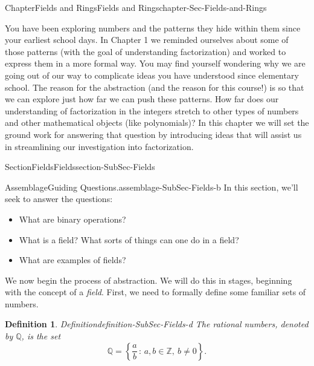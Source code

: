 \documentclass[oneside,10pt,]{book}
\numberwithin{equation}{section}
\newcommand{\setof}[2]{{\left\{#1\,\colon\,#2\right\}}}
\def\Z{{\mathbb Z}}
\def\Q{{\mathbb Q}}
\newtheorem{definition}[theorem]{Definition}
\begin{document}
\typeout{************************************************}
%
\begin{chapterptx}{Chapter}{Fields and Rings}{}{Fields and Rings}{}{}{chapter-Sec-Fields-and-Rings}
\renewcommand*{\chaptername}{Chapter}
\begin{introduction}{}%
You have been exploring numbers and the patterns they hide within them since your earliest school days. In Chapter 1 we reminded ourselves about some of those patterns (with the goal of understanding factorization) and worked to express them in a more formal way. You may find yourself wondering why we are going out of our way to complicate ideas you have understood since elementary school. The reason for the abstraction (and the reason for this course!) is so that we can explore just how far we can push these patterns. How far does our understanding of factorization in the integers stretch to other types of numbers and other mathematical objects (like polynomials)? In this chapter we will set the ground work for answering that question by introducing ideas that will assist us in streamlining our investigation into factorization.%
\end{introduction}%
%
%
\typeout{************************************************}
\typeout{************************************************}
%
\begin{sectionptx}{Section}{Fields}{}{Fields}{}{}{section-SubSec-Fields}
\begin{assemblage}{Assemblage}{Guiding Questions.}{assemblage-SubSec-Fields-b}%
In this section, we'll seek to answer the questions: %
\begin{itemize}[label=\textbullet]
\item{}What are binary operations?%
\item{}What is a field? What sorts of things can one do in a field?%
\item{}What are examples of fields?%
\end{itemize}
%
\end{assemblage}
We now begin the process of abstraction. We will do this in stages, beginning with the concept of a \emph{field}. First, we need to formally define some familiar sets of numbers.%
\begin{definition}{Definition}{}{definition-SubSec-Fields-d}%
The rational numbers, denoted by \(\Q\), is the set%
\begin{equation*}
\Q = \setof{\frac{a}{b}}{a,b\in \Z, \ b\ne 0}\text{.}
\end{equation*}

\end{definition}
\end{sectionptx}
\end{chapterptx}
\end{document}
